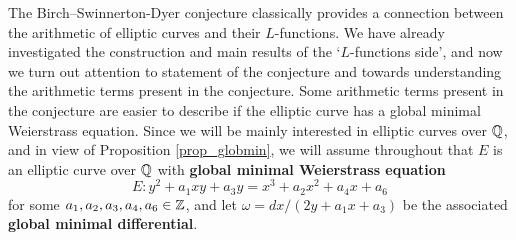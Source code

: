 The Birch--Swinnerton-Dyer conjecture classically provides a connection between the arithmetic of elliptic curves and their $L$-functions. We have already investigated the construction and main results of the `$L$-functions side', and now we turn out attention to statement of the conjecture and towards understanding the arithmetic terms present in the conjecture. Some arithmetic terms present in the conjecture are easier to describe if the elliptic curve has a global minimal Weierstrass equation. Since we will be mainly interested in elliptic curves over $\mathbb{Q}$, and in view of Proposition \ref{prop_globmin}, we will assume throughout that $E$ is an elliptic curve over $\mathbb{Q}$ with \textbf{global minimal Weierstrass equation}
$$E:y^2+a_1xy+a_3y=x^3+a_2x^2+a_4x+a_6$$ 
for some $a_1,a_2,a_3,a_4,a_6\in\mathbb{Z}$, and let 
$\omega= dx / (2y+a_1x+a_3)$
be the associated \textbf{global minimal differential}.



%

